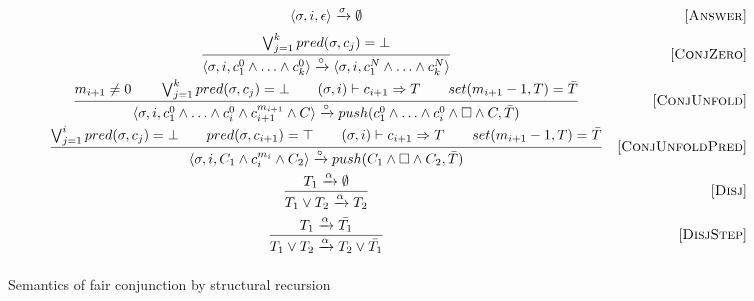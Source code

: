 \begin{figure}[h!]
\[\begin{array}{cr}

      {\langle \sigma, i, \epsilon \rangle \xrightarrow{\sigma} \emptyset}  
&     \mbox{[\textsc{Answer}]} \\[2mm]
\dfrac{\bigvee_{j=1}^k pred(\sigma, c_j) = \bot}
      {\langle \sigma, i, c_1^0 \land \ldots \land c_k^0 \rangle \xrightarrow{\circ} \langle \sigma, i, c_1^N \land \ldots \land c_k^N \rangle}
&     \mbox{[\textsc{ConjZero}]} \\[4mm]
\dfrac{m_{i+1} \not= 0 \qquad \bigvee_{j=1}^k pred(\sigma, c_j) = \bot \qquad (\sigma, i) \vdash c_{i+1} \Rightarrow T \qquad set(m_{i+1} - 1, T) = \bar{T}}
      {\langle \sigma, i, c_1^0 \land \ldots \land c_i^0 \land c_{i+1}^{m_{i+1}} \land C \rangle \xrightarrow{\circ} push(c_1^0 \land \ldots \land c_i^0 \land \Box \land C, \bar{T})}
&     \mbox{[\textsc{ConjUnfold}]} \\[4mm]
\dfrac{\bigvee_{j=1}^i pred(\sigma, c_j) = \bot \qquad pred(\sigma, c_{i+1}) = \top \qquad (\sigma, i) \vdash c_{i+1} \Rightarrow T \qquad set(m_{i+1} - 1, T) = \bar{T}}
      {\langle \sigma, i, C_1 \land c_i^{m_i} \land C_2 \rangle \xrightarrow{\circ} push(C_1 \land \Box \land C_2, \bar{T})}
&     \mbox{[\textsc{ConjUnfoldPred}]} \\[4mm]
\dfrac{T_1 \xrightarrow{\alpha} \emptyset}
      {T_1 \lor T_2 \xrightarrow{\alpha} T_2}
&     \mbox{[\textsc{Disj}]} \\[4mm]
\dfrac{T_1 \xrightarrow{\alpha} \bar{T_1}}
      {T_1 \lor T_2 \xrightarrow{\alpha} T_2 \lor\bar{T_1}}
&     \mbox{[\textsc{DisjStep}]} \\[4mm]
\end{array}\]
\caption{Semantics of fair conjunction by structural recursion}
\label{fair:structural-recursion-semantics}
\end{figure}

